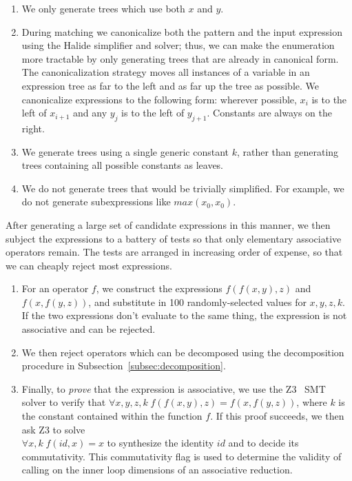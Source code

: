 \begin{enumerate}
\item We only generate trees which use both $x$ and $y$.
\item During matching we canonicalize both the pattern and the input expression using the Halide simplifier and solver; thus, we can make the enumeration more tractable by only generating trees that are already in canonical form.  The canonicalization strategy moves all instances of a variable in an expression tree as far to the left and as far up the tree as possible. We canonicalize expressions to the following form: wherever possible, $x_i$ is to the left of $x_{i+1}$ and any $y_j$ is to the left of $y_{j+1}$. Constants are always on the right.
\item We generate trees using a single generic constant $k$, rather than generating trees containing all possible constants as leaves.
\item We do not generate trees that would be trivially simplified. For example, we do not generate subexpressions like $max(x_0, x_0)$.
\end{enumerate}

After generating a large set of candidate expressions in this manner, we then subject the expressions to a battery of tests so that only elementary associative operators remain. The tests are arranged in increasing order of expense, so that we can cheaply reject most expressions.

\begin{enumerate}
\item For an operator $f$, we construct the expressions $f(f(x, y), z)$ and $f(x, f(y, z))$, and substitute in 100 randomly-selected values for $x, y, z, k$. If the two expressions don't evaluate to the same thing, the expression is not associative and can be rejected.
\item We then reject operators which can be decomposed using the decomposition procedure in Subsection~\ref{subsec:decomposition}.
\item Finally, to \emph{prove} that the expression is associative, we use the Z3~\cite{DeMoura:2008:ZES:1792734.1792766} SMT solver to verify that $\forall x, y, z, k \;f(f(x, y), z) = f(x, f(y, z))$, where $k$ is the constant contained within the function $f$. If this proof succeeds, we then ask Z3 to solve\\ $\forall x, k \;f(id, x) = x$ to synthesize the identity $id$ and to decide its commutativity. This commutativity flag is used to determine the validity of calling  on the inner loop dimensions of an associative reduction.   
\end{enumerate}

